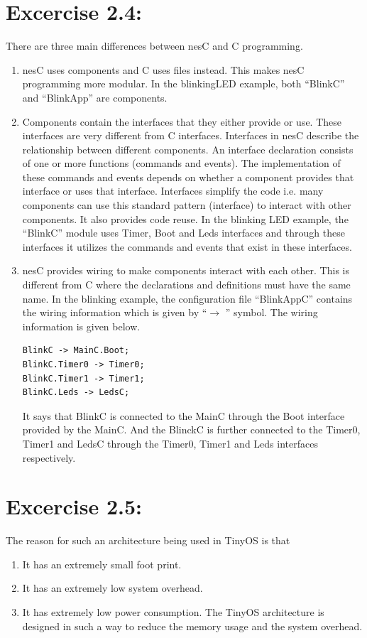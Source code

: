 \documentclass[11pt]{article} %
\begin{document}
\section*{Excercise 2.4:}
There are three main differences between nesC and C programming.
\begin{enumerate}
\item nesC uses components and C uses files instead. This makes nesC programming more modular. In the blinkingLED example, both ``BlinkC'' and ``BlinkApp'' are components.

\item Components contain the interfaces that they either provide or use. These interfaces are very different from C interfaces. Interfaces in nesC describe the relationship between different components. An interface declaration consists of one or more functions (commands and events). The implementation of these commands and events depends on whether a component provides that interface or uses that interface. Interfaces simplify the code i.e. many components can use this standard pattern (interface) to interact with other components. It also provides code reuse. In the blinking LED example, the ``BlinkC'' module uses Timer, Boot and Leds interfaces and through these interfaces it utilizes the commands and events that exist in these interfaces.

\item nesC provides wiring to make components interact with each other. This is different from C where the declarations and definitions must have the same name. In the blinking example, the configuration file ``BlinkAppC'' contains the wiring information which is given by ``$\rightarrow$ '' symbol. The wiring information is given below.

\begin{lstlisting}[frame=single]
BlinkC -> MainC.Boot; 
BlinkC.Timer0 -> Timer0;
BlinkC.Timer1 -> Timer1;
BlinkC.Leds -> LedsC;
\end{lstlisting}
It says that BlinkC is connected to the MainC through the Boot interface provided by the MainC. And the BlinckC is further connected to the Timer0, Timer1 and LedsC through the Timer0, Timer1 and Leds interfaces respectively.

\end{enumerate}
\section*{Excercise 2.5:}
The reason for such an architecture being used in TinyOS is that
\begin{enumerate}
\item It has an extremely small foot print.
\item It has an extremely low system overhead.
\item It has extremely low power consumption. The TinyOS architecture is designed in such a way to reduce the memory usage and the system overhead.
\end{enumerate}
\end{document}
